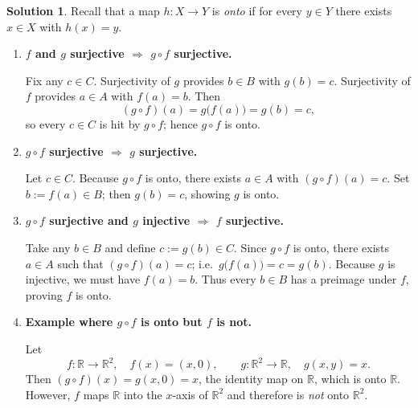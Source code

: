 \documentclass[12pt]{article}
\theoremstyle{definition} %
\newtheorem{solution}{Solution}
\theoremstyle{plain} %
\begin{document}
    \begin{solution}
    Recall that a map \(h:X\to Y\) is \emph{onto} if for every \(y\in Y\)
    there exists \(x\in X\) with \(h(x)=y\).
    
    \begin{enumerate}[label=(\alph*)]
    \item \textbf{\(f\) and \(g\) surjective \(\Longrightarrow\) \(g\circ f\) surjective.}
    
        Fix any \(c\in C\).
        Surjectivity of \(g\) provides \(b\in B\) with \(g(b)=c\).
        Surjectivity of \(f\) provides \(a\in A\) with \(f(a)=b\).
        Then
        \[
           (g\circ f)(a)=g\bigl(f(a)\bigr)=g(b)=c,
        \]
        so every \(c\in C\) is hit by \(g\circ f\); hence \(g\circ f\) is onto.
    
    \item \textbf{\(g\circ f\) surjective \(\Longrightarrow\) \(g\) surjective.}
    
        Let \(c\in C\).
        Because \(g\circ f\) is onto, there exists \(a\in A\) with
        \((g\circ f)(a)=c\).
        Set \(b:=f(a)\in B\); then \(g(b)=c\), showing \(g\) is onto.
    
    \item \textbf{\(g\circ f\) surjective and \(g\) injective \(\Longrightarrow\) \(f\) surjective.}
    
        Take any \(b\in B\) and define \(c:=g(b)\in C\).
        Since \(g\circ f\) is onto, there exists \(a\in A\) such that
        \((g\circ f)(a)=c\); i.e.\ \(g\bigl(f(a)\bigr)=c=g(b)\).
        Because \(g\) is injective, we must have \(f(a)=b\).
        Thus every \(b\in B\) has a preimage under \(f\), proving \(f\) is onto.
    
    \item \textbf{Example where \(g\circ f\) is onto but \(f\) is not.}
    
        Let
        \[
           f:\mathbb{R}\longrightarrow\mathbb{R}^{2},\quad f(x)=(x,0),
           \qquad
           g:\mathbb{R}^{2}\longrightarrow\mathbb{R},\quad g(x,y)=x.
        \]
        Then \((g\circ f)(x)=g(x,0)=x\), the identity map on \(\mathbb{R}\),
        which is onto \(\mathbb{R}\).
        However, \(f\) maps \(\mathbb{R}\) into the \(x\)-axis of \(\mathbb{R}^{2}\)
        and therefore is \emph{not} onto \(\mathbb{R}^{2}\).
    \end{enumerate}
    \end{solution}
\end{document}
